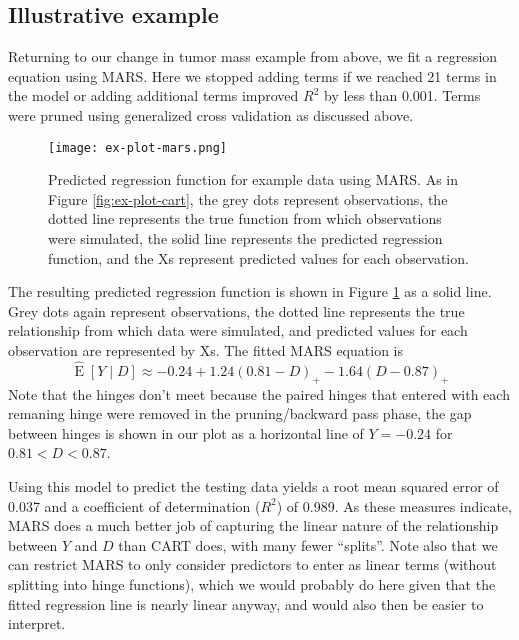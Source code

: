 \documentclass[12pt]{article}
\begin{document}

\subsection{Illustrative example} %
\label{sub:example}

Returning to our change in tumor mass example from above, we fit a regression equation using MARS. Here we stopped adding terms if we reached 21 terms in the model or adding additional terms improved $R^2$ by less than 0.001. Terms were pruned using generalized cross validation as discussed above.

\begin{figure}[h]
\begin{center}
\texttt{[image: ex-plot-mars.png]}
\end{center}
\caption[Predicted regression function for example data using MARS]{Predicted regression function for example data using MARS. As in Figure \ref{fig:ex-plot-cart}, the grey dots represent observations, the dotted line represents the true function from which observations were simulated, the solid line represents the predicted regression function, and the Xs represent predicted values for each observation.}
\label{fig:ex-plot-mars}
\end{figure}

The resulting predicted regression function is shown in Figure \ref{fig:ex-plot-mars} as a solid line. Grey dots again represent observations, the dotted line represents the true relationship from which data were simulated, and predicted values for each observation are represented by Xs. The fitted MARS equation is
\begin{equation}
  \label{eq:mars-eqn}
  \hat{\operatorname{E}}[Y \mid D] \approx -0.24 + 1.24 (0.81 - D)_{+} -1.64 (D - 0.87)_{+}
\end{equation}
Note that the hinges don't meet because the paired hinges that entered with each remaning hinge were removed in the pruning/backward pass phase, the gap between hinges is shown in our plot as a horizontal line of $Y = -0.24$ for $0.81 < D < 0.87$. 

Using this model to predict the testing data yields a root mean squared error of 0.037 and a coefficient of determination ($R^2$) of 0.989. As these measures indicate, MARS does a much better job of capturing the linear nature of the relationship between $Y$ and $D$ than CART does, with many fewer ``splits''. Note also that we can restrict MARS to only consider predictors to enter as linear terms (without splitting into hinge functions), which we would probably do here given that the fitted regression line is nearly linear anyway, and would also then be easier to interpret.
\end{document}
